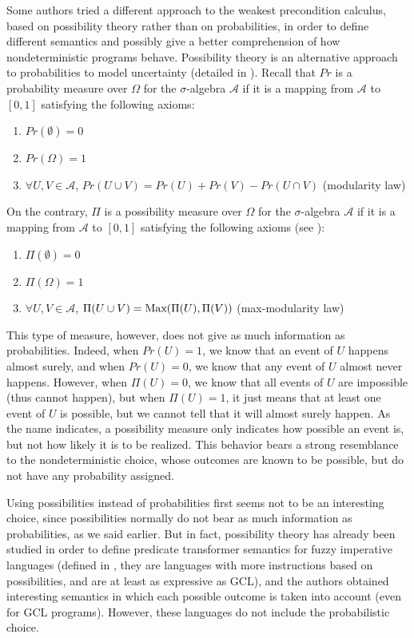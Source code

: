 \documentclass[a4paper,10pt]{llncs}
\def\Max {\textnormal {Max}}
\begin{document}
Some authors \cite{WuChen08,WuChen11,WuChen12} tried a different approach to the weakest precondition calculus, based on possibility theory rather than on probabilities, in order to define different semantics and possibly give a better comprehension of how nondeterministic programs behave.
Possibility theory is an alternative approach to probabilities to model uncertainty (detailed in \cite{Agarwal15,Shapiro09}). Recall that $Pr$ is a probability measure over $\Omega$ for the $\sigma$-algebra $\mathcal{A}$ if it is a mapping from $\mathcal{A}$ to $[0,1]$ satisfying the following axioms:
\begin{enumerate}
\item $Pr(\emptyset) = 0$
\item $Pr(\Omega) = 1$
\item $\forall U,V \in \mathcal{A}$, $Pr(U \cup V) = Pr(U) + Pr(V) - Pr(U \cap V)$ (modularity law)
\end{enumerate}
On the contrary, $\Pi$ is a possibility measure over $\Omega$ for the $\sigma$-algebra $\mathcal{A}$ if it is a mapping from $\mathcal{A}$ to $[0,1]$ satisfying the following axioms (see \cite{Agarwal15,Shapiro09} ):
\begin{enumerate}
\item $\Pi(\emptyset) = 0$
\item $\Pi(\Omega) = 1$
\item $\forall U,V \in \mathcal{A}$, $\Pi(U \cup V) = \Max( \Pi(U), \Pi(V))$ (max-modularity law)
\end{enumerate}
This type of measure, however, does not give as much information as probabilities. Indeed, when $Pr(U) = 1$, we know that an event of $U$ happens almost surely, and when $Pr(U) = 0$, we know that any event of $U$ almost never happens. However, when $\Pi(U) = 0$, we know that all events of $U$ are impossible (thus cannot happen), but when $\Pi(U) = 1$, it just means that at least one event of $U$ is possible, but we cannot tell that it will almost surely happen. As the name indicates, a possibility measure only indicates how possible an event is, but not how likely it is to be realized. This behavior bears a strong resemblance to the nondeterministic choice, whose outcomes are known to be possible, but do not have any probability assigned. \bigskip

Using possibilities instead of probabilities first seems not to be an interesting choice, since possibilities normally do not bear as much information as probabilities, as we said earlier. But in fact, possibility theory has already been studied \cite{WuChen08,WuChen11,WuChen12} in order to define predicate transformer semantics for fuzzy imperative languages (defined in \cite{Bueno93,Bueno97}, they are languages with more instructions based on possibilities, and are at least as expressive as GCL), and the authors obtained interesting semantics in which each possible outcome is taken into account (even for GCL programs). However, these languages do not include the probabilistic choice.\bigskip
\end{document}
